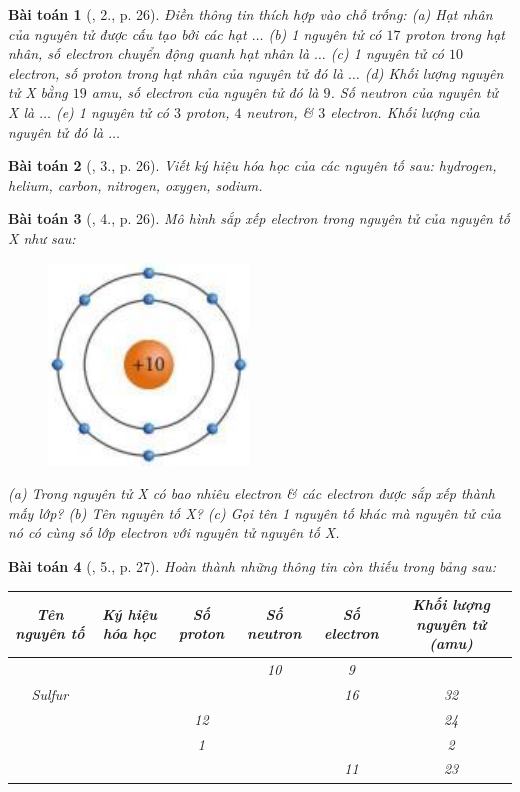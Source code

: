 \documentclass{article}
\newtheorem{baitoan}{Bài toán}
\begin{document}
\begin{baitoan}[\cite{SGK_KHTN_7_Canh_Dieu}, 2., p. 26]
	Điền thông tin thích hợp vào chỗ trống: (a) Hạt nhân của nguyên tử được cấu tạo bởi các hạt $\ldots$ (b) 1 nguyên tử có $17$ proton trong hạt nhân, số electron chuyển động quanh hạt nhân là $\ldots$ (c) 1 nguyên tử có $10$ electron, số proton trong hạt nhân của nguyên tử đó là $\ldots$ (d) Khối lượng nguyên tử X bằng $19$ amu, số electron của nguyên tử đó là $9$. Số neutron của nguyên tử X là $\ldots$ (e) 1 nguyên tử có $3$ proton, $4$ neutron, \& $3$ electron. Khối lượng của nguyên tử đó là $\ldots$
\end{baitoan}

\begin{baitoan}[\cite{SGK_KHTN_7_Canh_Dieu}, 3., p. 26]
	Viết ký hiệu hóa học của các nguyên tố sau: hydrogen, helium, carbon, nitrogen, oxygen, sodium.
\end{baitoan}

\begin{baitoan}[\cite{SGK_KHTN_7_Canh_Dieu}, 4., p. 26]
	Mô hình sắp xếp electron trong nguyên tử của nguyên tố X như sau:
	\begin{figure}[H]
		\centering
		\includegraphics[scale=0.3]{SGK_KHTN_7_CD_p_26}
	\end{figure}
	\noindent(a) Trong nguyên tử X có bao nhiêu electron \& các electron được sắp xếp thành mấy lớp? (b) Tên nguyên tố X? (c) Gọi tên 1 nguyên tố khác mà nguyên tử của nó có cùng số lớp electron với nguyên tử nguyên tố X.
\end{baitoan}

\begin{baitoan}[\cite{SGK_KHTN_7_Canh_Dieu}, 5., p. 27]
	Hoàn thành những thông tin còn thiếu trong bảng sau:
	\begin{table}[H]
		\centering
		\begin{tabular}{|c|c|c|c|c|c|}
			\hline
			Tên nguyên tố & Ký hiệu hóa học & Số proton & Số neutron & Số electron & Khối lượng nguyên tử (amu) \\
			\hline
			&  &  & 10 & 9 &  \\
			\hline
			Sulfur &  &  &  & 16 & 32 \\
			\hline
			&  & 12 &  &  & 24 \\
			\hline
			&  & 1 &  &  & 2 \\
			\hline
			&  &  &  & 11 & 23 \\
			\hline
		\end{tabular}
	\end{table}
\end{baitoan}
\end{document}
